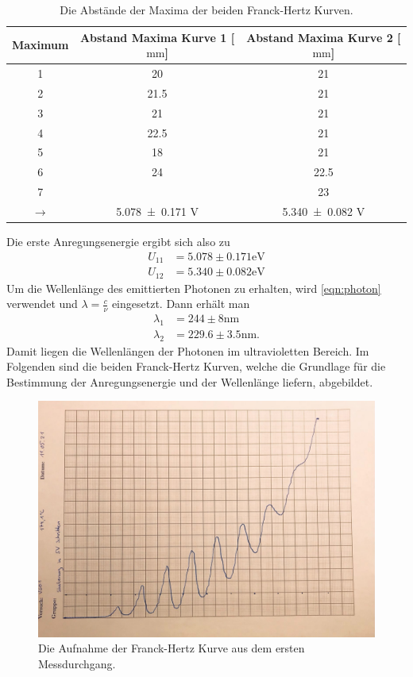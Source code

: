 \begin{table}[H]
  \centering
  \caption{Die Abstände der Maxima der beiden Franck-Hertz Kurven.}
  \label{tab:skalierungauswfranckhertz}
    \begin{tabular}{S S S}
      \toprule
      {Maximum} & {Abstand Maxima Kurve 1 [$\si{\milli\meter}$]} & {Abstand Maxima Kurve 2
      [$\si{\milli\meter}$]} \\
        &  20   & 21   \\
      2  &  21.5 & 21   \\
      3  &  21   & 21   \\
      4  &  22.5 & 21   \\
      5  &  18   & 21   \\
      6  &  24   & 22.5 \\
      7  &       & 23   \\
      {$\rightarrow$} & \num{5.078 \pm 0.171} V  & \num{5.340 \pm 0.082} V \\
      \bottomrule
    \end{tabular}
  \end{table}
\noindent
Die erste Anregungsenergie ergibt sich also zu
\begin{align}
  U_{11}  & = 5.078 \pm 0.171 \si{\electronvolt} \\
  U_{12}  & = 5.340 \pm 0.082 \si{\electronvolt}
  \label{eqn:erstanr}
\end{align}
Um die Wellenlänge des emittierten Photonen zu erhalten, wird \eqref{eqn:photon}
verwendet und $\lambda = \frac{c}{\nu}$ eingesetzt. Dann erhält man
\begin{align}
  \lambda_1 & = 244 \pm 8  \si{\nano\meter} \\
  \lambda_2 & = 229.6 \pm 3.5 \si{\nano\meter}.
  \label{eqn:wellenl}
\end{align}
Damit liegen die Wellenlängen der Photonen im ultravioletten Bereich.
Im Folgenden sind die beiden Franck-Hertz Kurven, welche die Grundlage für die
Bestimmung der Anregungsenergie und der Wellenlänge liefern, abgebildet.
\begin{figure}[H]
  \centering
  \includegraphics[scale=0.25]{content/kurv3.jpeg}
  \caption{Die Aufnahme der Franck-Hertz Kurve aus dem ersten Messdurchgang.}
  \label{fig:franckhertz1}
\end{figure}
